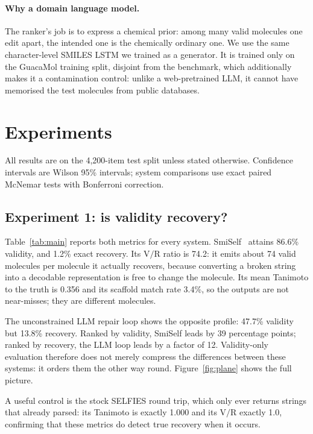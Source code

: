 \documentclass[11pt]{article}
\begin{document}
\paragraph{Why a domain language model.}
The ranker's job is to express a chemical prior: among many valid molecules one
edit apart, the intended one is the chemically ordinary one. We use the same
character-level SMILES LSTM we trained as a generator. It is trained only on the
GuacaMol training split, disjoint from the benchmark, which additionally makes
it a contamination control: unlike a web-pretrained LLM, it cannot have
memorised the test molecules from public databases.

\section{Experiments}

All results are on the 4{,}200-item test split unless stated otherwise.
Confidence intervals are Wilson 95\% intervals; system comparisons use exact
paired McNemar tests with Bonferroni correction.

\subsection{Experiment 1: is validity recovery?}\label{sec:exp1}

Table~\ref{tab:main} reports both metrics for every system.
SmiSelf~\citep{smiself2025} attains 86.6\% validity, and 1.2\% exact
recovery. Its $\mathrm{V/R}$ ratio is 74.2: it emits about 74 valid molecules
per molecule it actually recovers, because converting a broken string into a
decodable representation is free to change the molecule. Its mean Tanimoto to
the truth is 0.356 and its scaffold match rate 3.4\%, so the outputs are not
near-misses; they are different molecules.

The unconstrained LLM repair loop shows the opposite profile: 47.7\% validity
but 13.8\% recovery. Ranked by validity, SmiSelf leads by 39 percentage points;
ranked by recovery, the LLM loop leads by a factor of 12. Validity-only
evaluation therefore does not merely compress the differences between these
systems: it orders them the other way round. Figure~\ref{fig:plane} shows the
full picture.

A useful control is the stock SELFIES round trip, which only ever returns
strings that already parsed: its Tanimoto is exactly 1.000 and its
$\mathrm{V/R}$ exactly 1.0, confirming that these metrics do detect true
recovery when it occurs.
\end{document}
